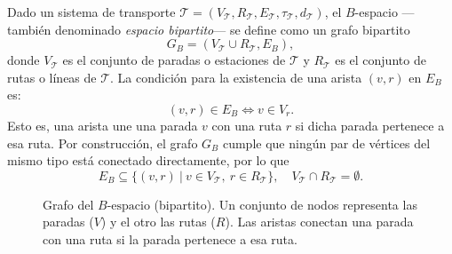                 \begin{definicion}[$B$-espacio]
                    Dado un sistema de transporte $\mathcal{T} = (V_{\mathcal{T}}, R_{\mathcal{T}}, E_{\mathcal{T}}, \tau_{\mathcal{T}}, d_{\mathcal{T}})$, el $B$-espacio —también denominado \textit{espacio bipartito}— se define como un grafo bipartito
                    $$
                        G_B = (V_{\mathcal{T}} \cup R_{\mathcal{T}}, E_B),
                    $$
                    donde $V_{\mathcal{T}}$ es el conjunto de paradas o estaciones de $\mathcal{T}$ y $R_{\mathcal{T}}$ es el conjunto de rutas o líneas de $\mathcal{T}$.
                    La condición para la existencia de una arista $(v,r)$ en $E_B$ es:
                    $$
                        (v,r)\in E_B \iff v\in V_r.
                    $$
                    Esto es, una arista une una parada $v$ con una ruta $r$ si dicha parada pertenece a esa ruta. Por construcción, el grafo $G_B$ cumple que ningún par de vértices del mismo tipo está conectado directamente, por lo que
                    $$
                        E_B \subseteq \{(v,r)\ |\ v\in V_{\mathcal{T}},\ r\in R_{\mathcal{T}}\}, \quad V_{\mathcal{T}}\cap R_{\mathcal{T}}=\emptyset.
                    $$
                \end{definicion}

                \begin{figure}[H]
                    \centering
                    \caption{Grafo del $B\text{-espacio}$ (bipartito). Un conjunto de nodos representa las paradas ($V$) y el otro las rutas ($R$). Las aristas conectan una parada con una ruta si la parada pertenece a esa ruta.}
                    \label{fig:b_espacio}
                \end{figure}
                
